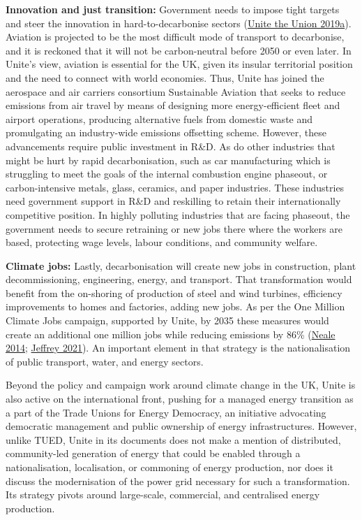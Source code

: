 \documentclass[a4paper, nobind]{templates/ociamthesis}
\begin{document}
\textbf{Innovation and just transition:} Government needs to impose tight targets and steer the innovation in hard-to-decarbonise sectors (\protect\hyperlink{ref-unite_the_union_response_2019}{Unite the Union 2019a}). Aviation is projected to be the most difficult mode of transport to decarbonise, and it is reckoned that it will not be carbon-neutral before 2050 or even later. In Unite's view, aviation is essential for the UK, given its insular territorial position and the need to connect with world economies. Thus, Unite has joined the aerospace and air carriers consortium Sustainable Aviation that seeks to reduce emissions from air travel by means of designing more energy-efficient fleet and airport operations, producing alternative fuels from domestic waste and promulgating an industry-wide emissions offsetting scheme. However, these advancements require public investment in R\&D. As do other industries that might be hurt by rapid decarbonisation, such as car manufacturing which is struggling to meet the goals of the internal combustion engine phaseout, or carbon-intensive metals, glass, ceramics, and paper industries. These industries need government support in R\&D and reskilling to retain their internationally competitive position. In highly polluting industries that are facing phaseout, the government needs to secure retraining or new jobs there where the workers are based, protecting wage levels, labour conditions, and community welfare.

\textbf{Climate jobs:} Lastly, decarbonisation will create new jobs in construction, plant decommissioning, engineering, energy, and transport. That transformation would benefit from the on-shoring of production of steel and wind turbines, efficiency improvements to homes and factories, adding new jobs. As per the One Million Climate Jobs campaign, supported by Unite, by 2035 these measures would create an additional one million jobs while reducing emissions by 86\% (\protect\hyperlink{ref-neale_one_2014}{Neale 2014}; \protect\hyperlink{ref-jeffrey_climate_2021}{Jeffrey 2021}). An important element in that strategy is the nationalisation of public transport, water, and energy sectors.

Beyond the policy and campaign work around climate change in the UK, Unite is also active on the international front, pushing for a managed energy transition as a part of the Trade Unions for Energy Democracy, an initiative advocating democratic management and public ownership of energy infrastructures. However, unlike TUED, Unite in its documents does not make a mention of distributed, community-led generation of energy that could be enabled through a nationalisation, localisation, or commoning of energy production, nor does it discuss the modernisation of the power grid necessary for such a transformation. Its strategy pivots around large-scale, commercial, and centralised energy production.
\end{document}
